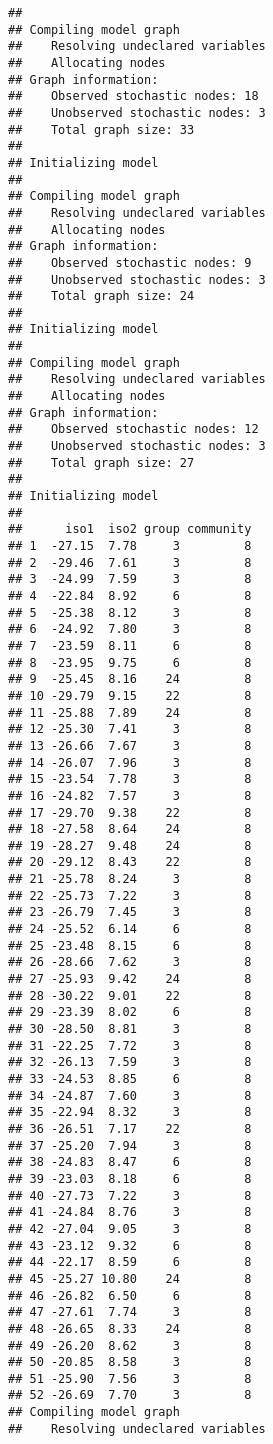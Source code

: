 \documentclass[
]{article}
\begin{document}
\begin{verbatim}
## 
## Compiling model graph
##    Resolving undeclared variables
##    Allocating nodes
## Graph information:
##    Observed stochastic nodes: 18
##    Unobserved stochastic nodes: 3
##    Total graph size: 33
## 
## Initializing model
## 
## Compiling model graph
##    Resolving undeclared variables
##    Allocating nodes
## Graph information:
##    Observed stochastic nodes: 9
##    Unobserved stochastic nodes: 3
##    Total graph size: 24
## 
## Initializing model
## 
## Compiling model graph
##    Resolving undeclared variables
##    Allocating nodes
## Graph information:
##    Observed stochastic nodes: 12
##    Unobserved stochastic nodes: 3
##    Total graph size: 27
## 
## Initializing model
## 
##      iso1  iso2 group community
## 1  -27.15  7.78     3         8
## 2  -29.46  7.61     3         8
## 3  -24.99  7.59     3         8
## 4  -22.84  8.92     6         8
## 5  -25.38  8.12     3         8
## 6  -24.92  7.80     3         8
## 7  -23.59  8.11     6         8
## 8  -23.95  9.75     6         8
## 9  -25.45  8.16    24         8
## 10 -29.79  9.15    22         8
## 11 -25.88  7.89    24         8
## 12 -25.30  7.41     3         8
## 13 -26.66  7.67     3         8
## 14 -26.07  7.96     3         8
## 15 -23.54  7.78     3         8
## 16 -24.82  7.57     3         8
## 17 -29.70  9.38    22         8
## 18 -27.58  8.64    24         8
## 19 -28.27  9.48    24         8
## 20 -29.12  8.43    22         8
## 21 -25.78  8.24     3         8
## 22 -25.73  7.22     3         8
## 23 -26.79  7.45     3         8
## 24 -25.52  6.14     6         8
## 25 -23.48  8.15     6         8
## 26 -28.66  7.62     3         8
## 27 -25.93  9.42    24         8
## 28 -30.22  9.01    22         8
## 29 -23.39  8.02     6         8
## 30 -28.50  8.81     3         8
## 31 -22.25  7.72     3         8
## 32 -26.13  7.59     3         8
## 33 -24.53  8.85     6         8
## 34 -24.87  7.60     3         8
## 35 -22.94  8.32     3         8
## 36 -26.51  7.17    22         8
## 37 -25.20  7.94     3         8
## 38 -24.83  8.47     6         8
## 39 -23.03  8.18     6         8
## 40 -27.73  7.22     3         8
## 41 -24.84  8.76     3         8
## 42 -27.04  9.05     3         8
## 43 -23.12  9.32     6         8
## 44 -22.17  8.59     6         8
## 45 -25.27 10.80    24         8
## 46 -26.82  6.50     6         8
## 47 -27.61  7.74     3         8
## 48 -26.65  8.33    24         8
## 49 -26.20  8.62     3         8
## 50 -20.85  8.58     3         8
## 51 -25.90  7.56     3         8
## 52 -26.69  7.70     3         8
## Compiling model graph
##    Resolving undeclared variables

\end{verbatim}
\end{document}
